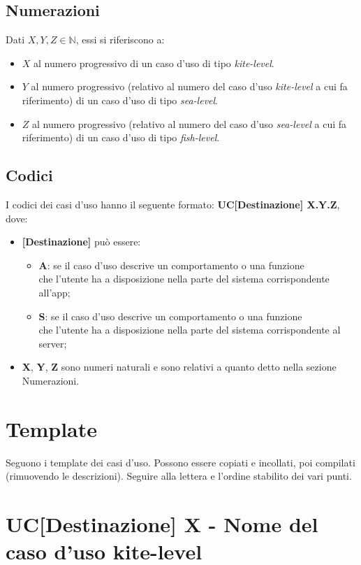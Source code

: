 \documentclass[a4paper, oneside]{article} %
\begin{document}
\subsection{Numerazioni}
Dati $X, Y, Z \in \mathbb{N}$, essi si riferiscono a:
\begin{itemize}
	\item $X$ al numero progressivo di un caso d'uso di tipo \textit{kite-level}.
	\item $Y$ al numero progressivo (relativo al numero del caso d'uso \textit{kite-level} a cui fa riferimento) di un caso d'uso di tipo \textit{sea-level}.
	\item $Z$ al numero progressivo (relativo al numero del caso d'uso \textit{sea-level} a cui fa riferimento) di un caso d'uso di tipo \textit{fish-level}.
\end{itemize}

\subsection{Codici}
I codici dei casi d'uso hanno il seguente formato: \textbf{UC[Destinazione] X.Y.Z}, dove:
\begin{itemize}
	\item \textbf{[Destinazione]} può essere:
		\begin{itemize}
			\item \textbf{A}: se il caso d’uso descrive un comportamento o una funzione \\che l’utente ha a disposizione nella parte del sistema corrispondente all’app;
			\item \textbf{S}: se il caso d’uso descrive un comportamento o una funzione \\che l’utente ha a disposizione nella parte del sistema corrispondente al server;
		\end{itemize}
	\item \textbf{X}, \textbf{Y}, \textbf{Z} sono numeri naturali e sono relativi a quanto detto nella sezione Numerazioni.
\end{itemize}

\section{Template}
Seguono i template dei casi d'uso. Possono essere copiati e incollati, poi compilati (rimuovendo le descrizioni). Seguire alla lettera e l'ordine stabilito dei vari punti.
\section{UC[Destinazione] X - Nome del caso d'uso kite-level} %
\end{document}
